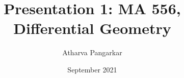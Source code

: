 \documentclass[12pt, a4paper]{beamer}
\title{Presentation 1: MA 556, Differential Geometry}
\author{Atharva Pangarkar\\ \small{}}
\date{ September 2021}
\begin{document}
\frame{\maketitle}
\end{document}
